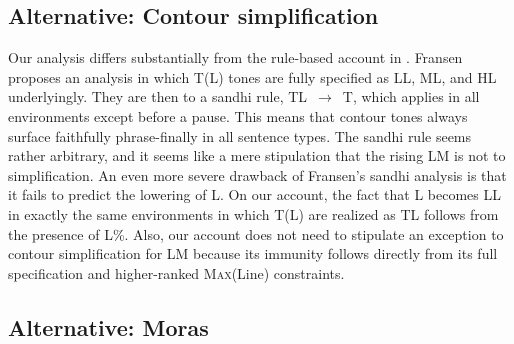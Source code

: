 \documentclass[output=paper,newtxmath,modfonts,nonflat,hidelinks]{langsci/langscibook}
\begin{document}

\subsection{Alternative: Contour simplification}

Our analysis differs substantially from the rule-based account in \citet{Fransen.1995}.
Fransen proposes an analysis in which T(L) tones are fully specified as LL, ML, and HL underlyingly.
They are then  to a  sandhi rule, TL~$\to$~T, which applies in all environments except before a pause.
This means that contour tones always surface faithfully phrase-finally in all sentence types.
The  sandhi rule seems rather arbitrary, and it seems like a mere stipulation that the rising  LM is not  to simplification.
An even more severe drawback of Fransen's sandhi analysis is that it fails to predict the lowering of L.
On our account, the fact that L becomes LL in exactly the same environments in which T(L) are realized as TL follows from the presence of L\%.
Also, our account does not need to stipulate an exception to contour simplification for LM because its immunity follows directly from its full specification and higher-ranked \textsc{Max}(Line) constraints. 


\subsection{Alternative: Moras}
\end{document}
